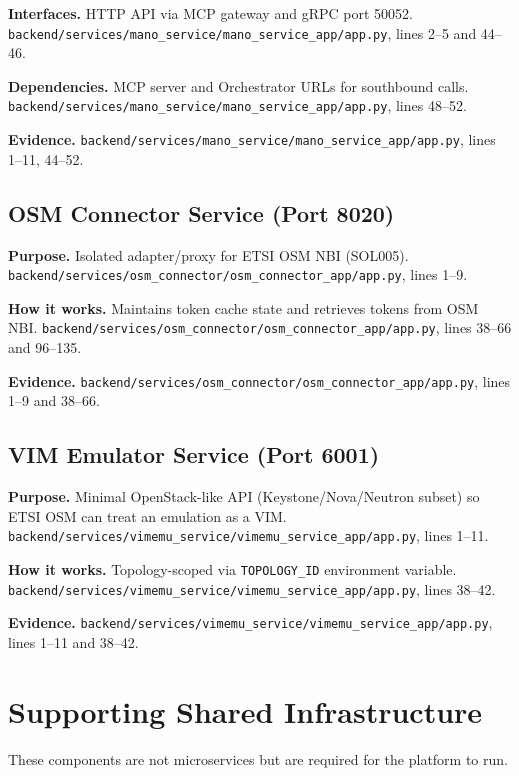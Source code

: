 \documentclass[conference]{IEEEtran}
\begin{document}
\textbf{Interfaces.} HTTP API via MCP gateway and gRPC port 50052. \texttt{backend/services/mano\_service/mano\_service\_app/app.py}, lines 2--5 and 44--46.

\textbf{Dependencies.} MCP server and Orchestrator URLs for southbound calls. \texttt{backend/services/mano\_service/mano\_service\_app/app.py}, lines 48--52.

\textbf{Evidence.} \texttt{backend/services/mano\_service/mano\_service\_app/app.py}, lines 1--11, 44--52.

\subsection{OSM Connector Service (Port 8020)}
\textbf{Purpose.} Isolated adapter/proxy for ETSI OSM NBI (SOL005). \texttt{backend/services/osm\_connector/osm\_connector\_app/app.py}, lines 1--9.

\textbf{How it works.} Maintains token cache state and retrieves tokens from OSM NBI. \texttt{backend/services/osm\_connector/osm\_connector\_app/app.py}, lines 38--66 and 96--135.

\textbf{Evidence.} \texttt{backend/services/osm\_connector/osm\_connector\_app/app.py}, lines 1--9 and 38--66.

\subsection{VIM Emulator Service (Port 6001)}
\textbf{Purpose.} Minimal OpenStack-like API (Keystone/Nova/Neutron subset) so ETSI OSM can treat an emulation as a VIM. \texttt{backend/services/vimemu\_service/vimemu\_service\_app/app.py}, lines 1--11.

\textbf{How it works.} Topology-scoped via \texttt{TOPOLOGY\_ID} environment variable. \texttt{backend/services/vimemu\_service/vimemu\_service\_app/app.py}, lines 38--42.

\textbf{Evidence.} \texttt{backend/services/vimemu\_service/vimemu\_service\_app/app.py}, lines 1--11 and 38--42.

\section{Supporting Shared Infrastructure}
These components are not microservices but are required for the platform to run.
\end{document}
